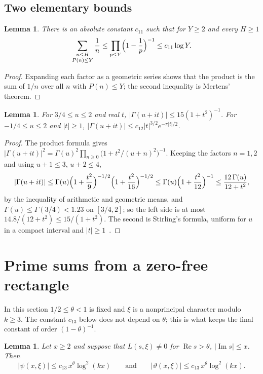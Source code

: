 \documentclass[11pt,a4paper,reqno]{amsart}
\newtheorem{lemma}[theorem]{Lemma}
\theoremstyle{remark}
\numberwithin{equation}{section}
\renewcommand{\Re}{\operatorname{Re}}
\renewcommand{\Im}{\operatorname{Im}}
\begin{document}
\subsection{Two elementary bounds}

\begin{lemma}\label{lem:smooth}
There is an absolute constant $c_{11}$ such that for $Y\ge2$ and every $H\ge1$
\[
  \sum_{\substack{n\le H\\P(n)\le Y}}\frac1n\le\prod_{p\le Y}\Bigl(1-\frac1p\Bigr)^{-1}\le c_{11}\log Y.
\]
\end{lemma}

\begin{proof}
Expanding each factor as a geometric series shows that the product is the sum of $1/n$ over all $n$ with $P(n)\le Y$; the second inequality is Mertens' theorem.
\end{proof}

\begin{lemma}\label{lem:gamma}
For $3/4\le u\le2$ and real $t$, $|\Gamma(u+it)|\le 15(1+t^2)^{-1}$. For $-1/4\le u\le2$ and $|t|\ge1$, $|\Gamma(u+it)|\le c_{12}|t|^{3/2}e^{-\pi|t|/2}$.
\end{lemma}

\begin{proof}
The product formula gives $|\Gamma(u+it)|^2=\Gamma(u)^2\prod_{n\ge0}\bigl(1+t^2/(u+n)^2\bigr)^{-1}$. Keeping the factors $n=1,2$ and using $u+1\le3$, $u+2\le4$,
\[
  |\Gamma(u+it)|\le\Gamma(u)\Bigl(1+\frac{t^2}9\Bigr)^{-1/2}\Bigl(1+\frac{t^2}{16}\Bigr)^{-1/2}\le\Gamma(u)\Bigl(1+\frac{t^2}{12}\Bigr)^{-1}\le\frac{12\,\Gamma(u)}{12+t^2},
\]
by the inequality of arithmetic and geometric means, and $\Gamma(u)\le\Gamma(3/4)<1.23$ on $[3/4,2]$; so the left side is at most $14.8/(12+t^2)\le15/(1+t^2)$. The second is Stirling's formula, uniform for $u$ in a compact interval and $|t|\ge1$~\cite[\S4.42]{Tit39}.
\end{proof}
\section{Prime sums from a zero-free rectangle}\label{sec:prime}

In this section $1/2\le\theta<1$ is fixed and $\xi$ is a nonprincipal character modulo $k\ge3$. The constant $c_{13}$ below does not depend on $\theta$; this is what keeps the final constant of order $(1-\theta)^{-1}$.

\begin{lemma}\label{lem:psi}
Let $x\ge2$ and suppose that $L(s,\xi)\ne0$ for $\Re s>\theta$, $|\Im s|\le x$. Then
\[
  |\psi(x,\xi)|\le c_{13}\,x^\theta\log^2(kx)\qquad\text{and}\qquad|\vartheta(x,\xi)|\le c_{13}\,x^\theta\log^2(kx).
\]
\end{lemma}
\end{document}

